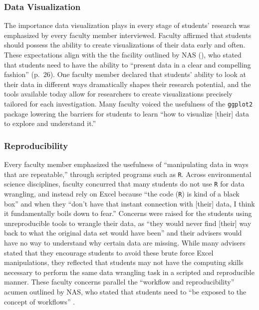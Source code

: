 \documentclass[12pt]{article}
\begin{document}
\subsubsection{Data Visualization} 

\quad The importance data visualization plays in every stage of students'
research was emphasized by every faculty member interviewed. Faculty affirmed
that students should possess the ability to create visualizations of their data
early and often. These expectations align with the the facility outlined by NAS
(\citeyear{nas}), who stated that students need to have the ability to ``present
data in a clear and compelling fashion'' (p.\ 26). One faculty member declared
that students' ability to look at their data in different ways dramatically
shapes their research potential, and the tools available today allow for
researchers to create visualizations precisely tailored for each investigation.
Many faculty voiced the usefulness of the \texttt{ggplot2} package \citep{ggplot} 
lowering the barriers for students to learn ``how to visualize [their] data to
explore and understand it.'' 

\subsubsection{Reproducibility}  

\quad Every faculty member emphasized the usefulness of ``manipulating data in
ways that are repeatable,'' through scripted programs such as \texttt{R}. Across
environmental science disciplines, faculty concurred that many students do not
use \texttt{R} for data wrangling, and instead rely on Excel because ``the code
(\texttt{R}) is kind of a black box'' and when they ``don't have that instant
connection with [their] data, I think it fundamentally boils down to fear.'' 
Concerns were raised for the students using unreproducible tools to wrangle
their data, as ``they would never find [their] way back to what the original
data set would have been'' and their advisers would have no way to understand
why certain data are missing. While many advisers stated that they encourage
students to avoid these brute force Excel manipulations, they reflected that 
students may not have the computing skills necessary to perform the same data
wrangling task in a scripted and reproducible manner. These faculty concerns
parallel the ``workflow and reproducibility'' acumen outlined by NAS, who stated
that students need to ``be exposed to the concept of workflows'' 
\citep[p.\ 28]{nas}. 
\end{document}
